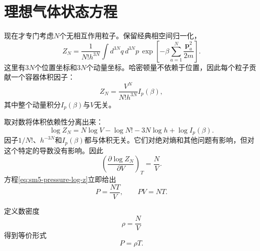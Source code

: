 \section{理想气体状态方程}

现在才专门考虑\(N\)个无相互作用粒子。保留经典相空间归一化，
\begin{equation}
 Z_N=
 \frac{1}{N!h^{3N}}
 \int d^{3N}q\,d^{3N}p\,
 \exp\!\left[
 -\beta\sum_{a=1}^{N}\frac{\mathbf p_a^2}{2m}
 \right].
 \label{eq:sm5-ideal-gas-partition-integral}
\end{equation}
这里有\(3N\)个位置坐标和\(3N\)个动量坐标。哈密顿量不依赖于位置，因此每个粒子贡献一个容器体积因子：
\begin{equation}
 Z_N=
 \frac{V^N}{N!h^{3N}}I_p(\beta),
 \label{eq:sm5-ideal-gas-factorization}
\end{equation}
其中整个动量积分\(I_p(\beta)\)与\(V\)无关。

\begin{classroomqa}
\end{classroomqa}

取对数将体积依赖性分离出来：
\begin{equation}
 \log Z_N
 =
 N\log V-\log N!-3N\log h+\log I_p(\beta).
 \label{eq:sm5-log-ideal-gas-partition}
\end{equation}
因子\(1/N!\)、\(h^{-3N}\)和\(I_p(\beta)\)都与体积无关。它们对绝对熵和其他问题有影响，但对这个特定的导数没有影响。因此
\begin{equation}
 \left(\frac{\partial\log Z_N}{\partial V}\right)_T
 =\frac{N}{V}.
 \label{eq:sm5-log-z-volume-derivative}
\end{equation}
方程\eqref{eq:sm5-pressure-log-z}立即给出
\begin{equation}
 P=\frac{NT}{V},
 \qquad
 \boxed{PV=NT}.
 \label{eq:sm5-ideal-gas-law}
\end{equation}

\begin{classroomqa}
\end{classroomqa}

定义数密度
\begin{equation}
 \rho=\frac{N}{V}
 \label{eq:sm5-number-density}
\end{equation}
得到等价形式
\begin{equation}
 P=\rho T.
 \label{eq:sm5-density-equation-of-state}
\end{equation}

